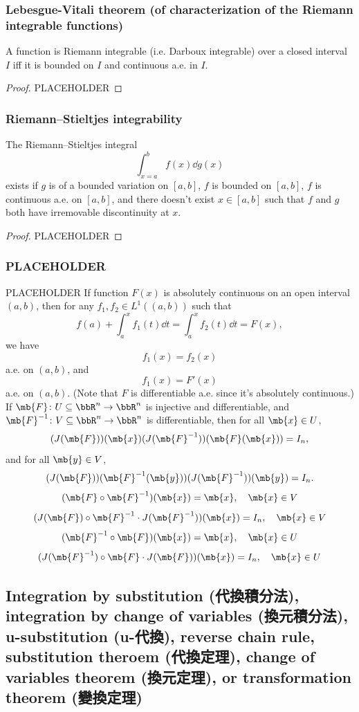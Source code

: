 \subsubsection{Lebesgue-Vitali theorem (of characterization of the Riemann integrable functions)}
A function is Riemann integrable (i.e. Darboux integrable) over a closed interval $I$ iff it is bounded on $I$ and continuous a.e. in $I$.
\begin{proof}
PLACEHOLDER
\end{proof}
\subsubsection{Riemann–Stieltjes integrability}
The Riemann–Stieltjes integral
\[\int_{x=a}^bf(x)\dd{g(x)}\]
exists if $g$ is of a bounded variation on $[a,b]$, $f$ is bounded on $[a,b]$, $f$ is continuous a.e. on $[a,b]$, and there doesn't exist $x\in[a,b]$ such that $f$ and $g$ both have irremovable discontinuity at $x$.
\begin{proof}
PLACEHOLDER
\end{proof}
\subsubsection{PLACEHOLDER}
PLACEHOLDER
If function $F(x)$ is absolutely continuous on an open interval $(a,b)$, then for any $f_1,f_2\in L^1((a,b))$ such that
\[f(a)+\int_a^xf_1(t)\dd{t}=\int_a^xf_2(t)\dd{t}=F(x),\]
we have
\[f_1(x)=f_2(x)\]
a.e. on $(a,b)$, and
\[f_1(x)=F'(x)\]
a.e. on $(a,b)$. (Note that $F$ is differentiable a.e. since it's absolutely continuous.)
If $\mb{F}\colon U\subseteq\bbR^n\to\bbR^n$ is injective and differentiable, and $\mb{F}^{-1}\colon V\subseteq\bbR^n\to\bbR^n$ is differentiable, then for all $\mb{x}\in U$,
\[(J(\mb{F}))(\mb{x})(J(\mb{F}^{-1}))(\mb{F}(\mb{x}))=I_n,\]
and for all $\mb{y}\in V$,
\[(J(\mb{F}))(\mb{F}^{-1}(\mb{y}))(J(\mb{F}^{-1}))(\mb{y})=I_n.\]
\bpr
\[(\mb{F}\circ\mb{F}^{-1})(\mb{x})=\mb{x},\quad\mb{x}\in V\]
\[(J(\mb{F})\circ\mb{F}^{-1}\cdot J(\mb{F}^{-1}))(\mb{x})=I_n,\quad\mb{x}\in V\]
\[(\mb{F}^{-1}\circ\mb{F})(\mb{x})=\mb{x},\quad\mb{x}\in U\]
\[(J(\mb{F}^{-1})\circ\mb{F}\cdot J(\mb{F}))(\mb{x})=I_n,\quad\mb{x}\in U\]
\epr
\subsection{Integration by substitution (代換積分法), integration by change of variables (換元積分法), u-substitution (u-代換), reverse chain rule, substitution theroem (代換定理), change of variables theorem (換元定理), or transformation theorem (變換定理)}
